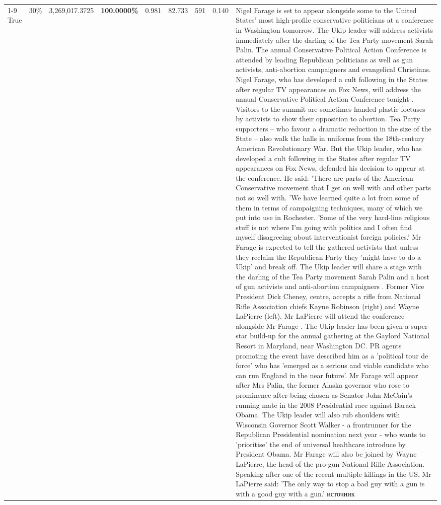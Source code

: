 \begin{table}[H]
\begin{tabular}{lllrlllll}
\cline{1-9} \cline{2-9}
True & 30\% & 3,269,017.3725 & \bfseries \color{red} 100.0000\% & 0.981 & 82.733 & 591 & 0.140 & Nigel Farage is set to appear alongside some to the United States' most high-profile conservative politicians at a conference in Washington tomorrow. The Ukip leader will address activists immediately after the darling of the Tea Party movement Sarah Palin. The annual Conservative Political Action Conference is attended by leading Republican politicians as well as gun activists, anti-abortion campaigners and evangelical Christians. Nigel Farage, who has developed a cult following in the States after regular TV appearances on Fox News, will address the annual Conservative Political Action Conference tonight . Visitors to the summit are sometimes handed plastic foetuses by activists to show their opposition to abortion. Tea Party supporters – who favour a dramatic reduction in the size of the State – also walk the halls in uniforms from the 18th-century American Revolutionary War. But the Ukip leader, who has developed a cult following in the States after regular TV appearances on Fox News, defended his decision to appear at the conference. He said: 'There are parts of the American Conservative movement that I get on well with and other parts not so well with. 'We have learned quite a lot from some of them in terms of campaigning techniques, many of which we put into use in Rochester. 'Some of the very hard-line religious stuff is not where I'm going with politics and I often find myself disagreeing about interventionist foreign policies.' Mr Farage is expected to tell the gathered activists that unless they reclaim the Republican Party they 'might have to do a Ukip' and break off. The Ukip leader will share a stage with the darling of the Tea Party movement Sarah Palin and a host of gun activists and anti-abortion campaigners . Former Vice President Dick Cheney, centre, accepts a rifle from National Rifle Association chiefs Kayne Robinson (right) and Wayne LaPierre (left). Mr LaPierre will attend the conference alongside Mr Farage . The Ukip leader has been given a super-star build-up for the annual gathering at the Gaylord National Resort in Maryland, near Washington DC. PR agents promoting the event have described him as a 'political tour de force' who has 'emerged as a serious and viable candidate who can run England in the near future'. Mr Farage will appear after Mrs Palin, the former Alaska governor who rose to prominence after being chosen as Senator John McCain's running mate in the 2008 Presidential race against Barack Obama. The Ukip leader will also rub shoulders with Wisconsin Governor Scott Walker - a frontrunner for the Republican Presidential nomination next year - who wants to 'prioritise' the end of universal healthcare introduce by President Obama. Mr Farage will also be joined by Wayne LaPierre, the head of the pro-gun National Rifle Association. Speaking after one of the recent multiple killings in the US, Mr LaPierre said: 'The only way to stop a bad guy with a gun is with a good guy with a gun.' источник \\

\end{tabular}
\end{table}
